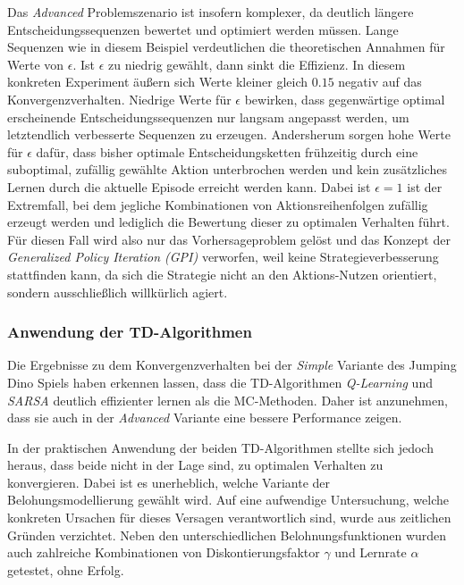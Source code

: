 Das \textit{Advanced} Problemszenario ist insofern komplexer, da deutlich längere Entscheidungssequenzen bewertet und optimiert werden müssen. Lange Sequenzen wie in diesem Beispiel verdeutlichen die theoretischen Annahmen für Werte von $\epsilon$. Ist $\epsilon$ zu niedrig gewählt, dann sinkt die Effizienz. In diesem konkreten Experiment äußern sich Werte kleiner gleich $0.15$ negativ auf das Konvergenzverhalten. Niedrige Werte für $\epsilon$ bewirken, dass gegenwärtige optimal erscheinende Entscheidungssequenzen nur langsam angepasst werden, um letztendlich verbesserte Sequenzen zu erzeugen. Andersherum sorgen hohe Werte für $\epsilon$ dafür, dass bisher optimale Entscheidungsketten frühzeitig durch eine suboptimal, zufällig gewählte Aktion unterbrochen werden und kein zusätzliches Lernen durch die aktuelle Episode erreicht werden kann. Dabei ist $\epsilon = 1$ ist der Extremfall, bei dem jegliche Kombinationen von Aktionsreihenfolgen zufällig erzeugt werden und lediglich die Bewertung dieser zu optimalen Verhalten führt. Für diesen Fall wird also nur das Vorhersageproblem gelöst und das Konzept der \textit{Generalized Policy Iteration (GPI)} verworfen, weil keine Strategieverbesserung stattfinden kann, da sich die Strategie nicht an den Aktions-Nutzen orientiert, sondern ausschließlich willkürlich agiert.
\subsubsection*{Anwendung der TD-Algorithmen}
Die Ergebnisse zu dem Konvergenzverhalten bei der \textit{Simple} Variante des Jumping Dino Spiels haben erkennen lassen, dass die TD-Algorithmen \textit{Q-Learning} und \textit{SARSA} deutlich effizienter lernen als die MC-Methoden. Daher ist anzunehmen, dass sie auch in der \textit{Advanced} Variante eine bessere Performance zeigen.
\par 
In der praktischen Anwendung der beiden TD-Algorithmen stellte sich jedoch heraus, dass beide nicht in der Lage sind, zu optimalen Verhalten zu konvergieren. Dabei ist es unerheblich, welche Variante der Belohungsmodellierung gewählt wird. Auf eine aufwendige  Untersuchung, welche konkreten Ursachen für dieses Versagen verantwortlich sind, wurde aus zeitlichen Gründen verzichtet. Neben den unterschiedlichen Belohnungsfunktionen wurden auch zahlreiche Kombinationen von Diskontierungsfaktor $\gamma$ und Lernrate $\alpha$ getestet, ohne Erfolg.
\par 

